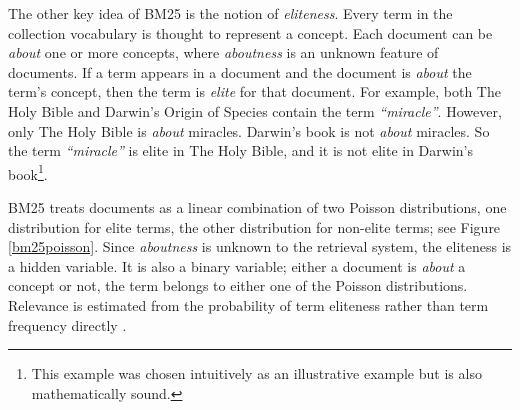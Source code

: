 The other key idea of BM25 is the notion of \textit{eliteness}. Every term in the collection vocabulary is thought to represent a concept. Each document can be \textit{about} one or more concepts, where \textit{aboutness} is an unknown feature of documents. If a term appears in a document and the document is \textit{about} the term's concept, then the term is \textit{elite} for that document. For example, both The Holy Bible and Darwin's Origin of Species contain the term \textit{``miracle''}. However, only The Holy Bible is \textit{about} miracles. Darwin's book is not \textit{about} miracles. So the term \textit{``miracle''} is elite in The Holy Bible, and it is not elite in Darwin's book\footnote{This example was chosen intuitively as an illustrative example but is also mathematically sound.}.

BM25 treats documents as a linear combination of two Poisson distributions, one distribution for elite terms, the other distribution for non-elite terms; see Figure \ref{bm25poisson}. Since \textit{aboutness} is unknown to the retrieval system, the eliteness is a hidden variable. It is also a binary variable; either a document is \textit{about} a concept or not, the term belongs to either one of the Poisson distributions. Relevance is estimated from the probability of term eliteness rather than term frequency directly \cite{bookstein1974probabilistic, harter1975probabilistic, robertson1995okapi}.

